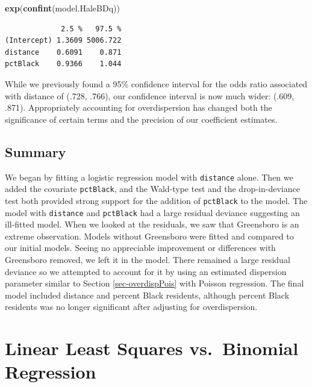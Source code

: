 \documentclass[
]{krantz}
\newenvironment{Shaded}{\begin{snugshade}}{\end{snugshade}}
\newcommand{\FunctionTok}[1]{\textcolor[rgb]{0.27,0.27,0.27}{\textbf{#1}}}
\newcommand{\NormalTok}[1]{#1}
\begin{document}
\begin{Shaded}
\begin{Highlighting}[]
\FunctionTok{exp}\NormalTok{(}\FunctionTok{confint}\NormalTok{(model.HaleBDq))}
\end{Highlighting}
\end{Shaded}

\begin{verbatim}
             2.5 %   97.5 %
(Intercept) 1.3609 5006.722
distance    0.6091    0.871
pctBlack    0.9366    1.044
\end{verbatim}

While we previously found a 95\% confidence interval for the odds ratio associated with distance of (.728, .766), our confidence interval is now much wider: (.609, .871). Appropriately accounting for overdispersion has changed both the significance of certain terms and the precision of our coefficient estimates.

\subsection{Summary}\label{summary-1}

We began by fitting a logistic regression model with \texttt{distance} alone. Then we added the covariate \texttt{pctBlack}, and the Wald-type test and the drop-in-deviance test both provided strong support for the addition of \texttt{pctBlack} to the model. The model with \texttt{distance} and \texttt{pctBlack} had a large residual deviance suggesting an ill-fitted model. When we looked at the residuals, we saw that Greensboro is an extreme observation. Models without Greensboro were fitted and compared to our initial models. Seeing no appreciable improvement or differences with Greensboro removed, we left it in the model. There remained a large residual deviance so we attempted to account for it by using an estimated dispersion parameter similar to Section \ref{sec-overdispPois} with Poisson regression. The final model included distance and percent Black residents, although percent Black residents was no longer significant after adjusting for overdispersion.

\section{\texorpdfstring{Linear Least Squares  vs.~Binomial Regression }{Linear Least Squares  vs.~Binomial Regression }}\label{linear-least-squares-vs.-binomial-regression}
\end{document}
